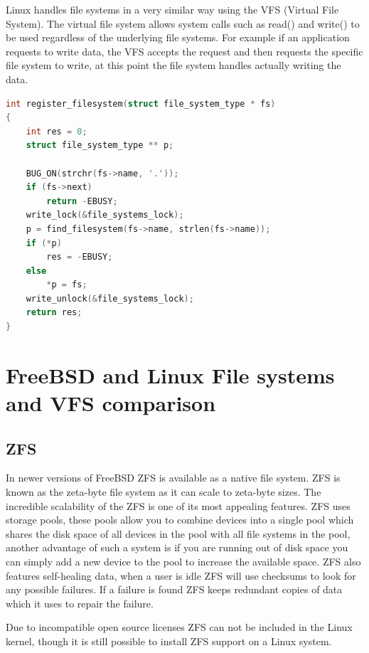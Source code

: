 \documentclass[letterpaper, 10pt, onecolumn, draftclsnofoot]{IEEEtran}
\begin{document}
Linux handles file systems in a very similar way using the VFS (Virtual File System). The virtual file system allows system calls such as read() and write() to be used regardless of the underlying file systems. For example if an application requests to write data, the VFS accepts the request and then requests the specific file system to write, at this point the file system handles actually writing the data.\cite{linux}

\begin{lstlisting}[language=C]
int register_filesystem(struct file_system_type * fs)
{
	int res = 0;
	struct file_system_type ** p;

	BUG_ON(strchr(fs->name, '.'));
	if (fs->next)
		return -EBUSY;
	write_lock(&file_systems_lock);
	p = find_filesystem(fs->name, strlen(fs->name));
	if (*p)
		res = -EBUSY;
	else
		*p = fs;
	write_unlock(&file_systems_lock);
	return res;
}
\end{lstlisting}

\section{FreeBSD and Linux File systems and VFS comparison}

\subsection{ZFS}

In newer versions of FreeBSD ZFS is available as a native file system. ZFS is known as the zeta-byte file system as it can scale to zeta-byte sizes. The incredible scalability of the ZFS is one of its most appealing features. ZFS uses storage pools, these pools allow you to combine devices into a single pool which shares the disk space of all devices in the pool with all file systems in
the pool, another advantage of such a system is if you are running out of disk space you can simply add a new device to the pool to increase the available space. ZFS also features self-healing data, when a user is idle ZFS will use checksums to look for any possible failures. If a failure is found ZFS keeps redundant copies of data which it uses to repair the failure.\cite{zfs, linuxfs}

Due to incompatible open source licenses ZFS can not be included in the Linux kernel, though it is still possible to install ZFS support on a Linux system.\cite{linuxfs}
\end{document}
